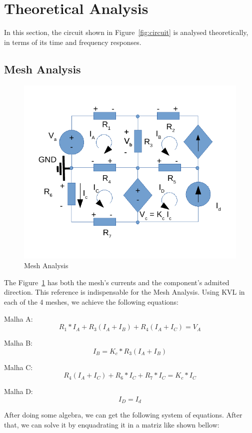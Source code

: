 \section{Theoretical Analysis}
\label{sec:analysis}

In this section, the circuit shown in Figure~\ref{fig:circuit} is analysed
theoretically, in terms of its time and frequency responses.

\subsection{Mesh Analysis}

\begin{figure}[h!] \centering
	\includegraphics[width=0.7\linewidth]{circ_mesh.pdf}
	\caption{Mesh Analysis}
	\label{fig:circuitMesh}
\end{figure}

The Figure~\ref{fig:circuitMesh} has both the mesh's currents and the 
component's admited direction.
This reference is indispensable for the Mesh Analysis.
Using KVL in each of the 4 meshes, we achieve the following equations:
\vspace{0.5cm}

Malha A:
$$ R_1 * I_A + R_3(I_A+I_B) + R_4(I_A+I_C) = V_A$$

Malha B:
$$ I_B = K_c * R_3(I_A + I_B) $$

Malha C:
$$ R_4(I_A + I_C) + R_6 * I_C + R_7 * I_C = K_c * I_C $$

Malha D:
$$ I_D = I_d $$

\vspace{0.5cm}

After doing some algebra, we can get the following system of equations. After that, 
we can solve it by enquadrating it in a matriz like shown bellow:

